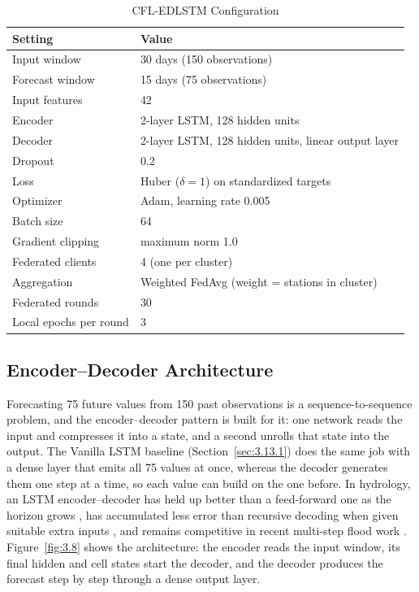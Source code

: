 \begin{table}[htbp]
  \centering
  \caption{CFL-EDLSTM Configuration}
  \label{tab:3.8}
  \footnotesize
  \renewcommand{\arraystretch}{1.2}
  \begin{tabular}{@{}L{5.2cm} L{8.0cm}@{}}
    \toprule
    \textbf{Setting} & \textbf{Value} \\
    \midrule
    Input window & 30 days (150 observations) \\
    Forecast window & 15 days (75 observations) \\
    Input features & 42 \\
    Encoder & 2-layer LSTM, 128 hidden units \\
    Decoder & 2-layer LSTM, 128 hidden units, linear output layer \\
    Dropout & 0.2 \\
    Loss & Huber ($\delta = 1$) on standardized targets \\
    Optimizer & Adam, learning rate 0.005 \\
    Batch size & 64 \\
    Gradient clipping & maximum norm 1.0 \\
    Federated clients & 4 (one per cluster) \\
    Aggregation & Weighted FedAvg (weight = stations in cluster) \\
    Federated rounds & 30 \\
    Local epochs per round & 3 \\
    \bottomrule
  \end{tabular}
\end{table}

\subsection{Encoder--Decoder Architecture}
\label{sec:3.12.1}

Forecasting 75 future values from 150 past observations is a
sequence-to-sequence problem, and the encoder--decoder pattern \cite{Cho2014} is
built for it: one network reads the input and compresses it into a state, and a
second unrolls that state into the output. The Vanilla LSTM baseline
(Section~\ref{sec:3.13.1}) does the same job with a dense layer that emits all
75 values at once, whereas the decoder generates them one step at a time, so
each value can build on the one before. In hydrology, an LSTM encoder--decoder
has held up better than a feed-forward one as the horizon grows \cite{Kao2020},
has accumulated less error than recursive decoding when given suitable extra
inputs \cite{Cui2022}, and remains competitive in recent multi-step flood work
\cite{Lim2025,Yuan2023}. Figure~\ref{fig:3.8} shows the architecture: the
encoder reads the input window, its final hidden and cell states start the
decoder, and the decoder produces the forecast step by step through a dense
output layer.

